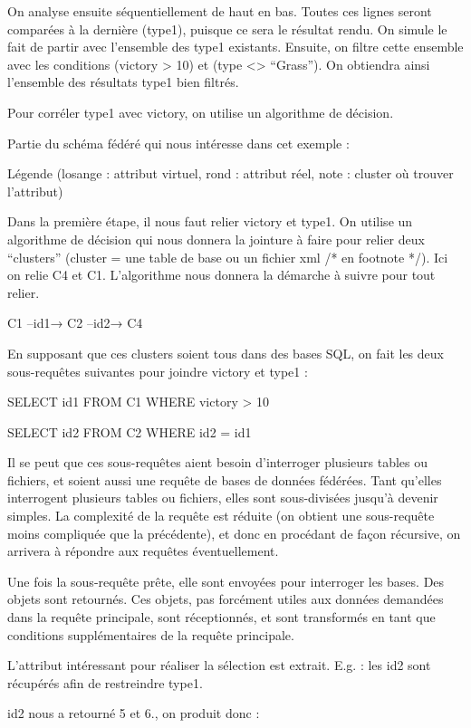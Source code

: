 On analyse ensuite séquentiellement de haut en bas. Toutes ces lignes seront comparées à la dernière (type1), puisque ce sera le résultat rendu. On simule le fait de partir avec l’ensemble des type1 existants. Ensuite, on filtre cette ensemble avec les conditions (victory > 10) et (type <> “Grass”). On obtiendra ainsi l’ensemble des résultats type1 bien filtrés.



Pour corréler type1 avec victory, on utilise un algorithme de décision.

Partie du schéma fédéré qui nous intéresse dans cet exemple :

Légende (losange : attribut virtuel, rond : attribut réel, note : cluster où trouver l’attribut)

Dans la première étape, il nous faut relier victory et type1. On utilise un algorithme de décision qui nous donnera la jointure à faire pour relier deux “clusters” (cluster = une table de base ou un fichier xml /* en footnote */). Ici on relie C4 et C1. L’algorithme nous donnera la démarche à suivre pour tout relier.

C1 --id1→ C2 --id2→  C4

En supposant que ces clusters soient tous dans des bases SQL, on fait les deux sous-requêtes suivantes pour joindre victory et type1 :

SELECT id1 FROM C1 WHERE victory > 10

SELECT id2 FROM C2 WHERE id2 = id1


Il se peut que ces sous-requêtes aient besoin d’interroger plusieurs tables ou fichiers, et soient aussi une requête de bases de données fédérées. Tant qu’elles interrogent plusieurs tables ou fichiers, elles sont sous-divisées jusqu’à devenir simples. La complexité de la requête est réduite (on obtient une sous-requête moins compliquée que la précédente), et donc en procédant de façon récursive, on arrivera à répondre aux requêtes éventuellement.

Une fois la sous-requête prête, elle sont envoyées pour interroger les bases. Des objets sont retournés. Ces objets, pas forcément utiles aux données demandées dans la requête principale, sont réceptionnés, et sont transformés en tant que conditions supplémentaires de la requête principale.

L’attribut intéressant pour réaliser la sélection est extrait. E.g. : les id2 sont récupérés afin de restreindre type1.

id2 nous a retourné 5 et 6., on produit donc :

